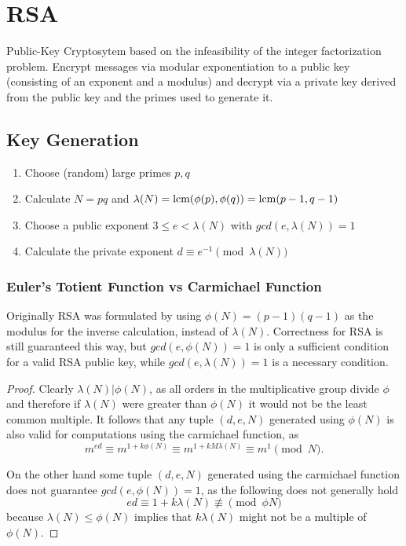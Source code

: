

\chapter{RSA}
\label{chap:rsa}

Public-Key Cryptosytem based on the infeasibility of the integer factorization problem. Encrypt messages via modular exponentiation to a public key (consisting of an exponent and a modulus) and decrypt via a private key derived from the public key and the primes used to generate it.

\section{Key Generation}
\begin{enumerate}
  \item Choose (random) large primes $p, q$
  \item Calculate $N = pq$ and $\lambda(N) = \operatorname{lcm}(\phi(p), \phi(q)) = \operatorname{lcm}(p-1, q-1)$
  \item Choose a public exponent $3 \leq e < \lambda(N)$ with $gcd(e, \lambda(N)) = 1$
  \item Calculate the private exponent $d \equiv e^{-1} \pmod{\lambda(N)}$
\end{enumerate}

\subsection{Euler's Totient Function vs Carmichael Function}

Originally RSA was formulated by using $\phi(N) = (p-1)(q-1)$ as the modulus for the inverse calculation, instead of $\lambda(N)$. Correctness for RSA is still guaranteed this way, but $gcd(e, \phi(N)) = 1$ is only a sufficient condition for a valid RSA public key, while $gcd(e, \lambda(N)) = 1$ is a necessary condition.

\begin{proof}
  Clearly $\lambda(N) | \phi(N)$, as all orders in the multiplicative group divide $\phi$ and therefore if $\lambda(N)$ were greater than $\phi(N)$ it would not be the least common multiple. It follows that any tuple $(d, e, N)$ generated using $\phi(N)$ is also valid for computations using the carmichael function, as
  \[ m^{ed} \equiv m^{1 + k\phi(N)} \equiv m^{1 + kM\lambda(N)} \equiv m^1 \pmod{N}. \]

  On the other hand some tuple $(d, e, N)$ generated using the carmichael function does not guarantee $gcd(e, \phi(N)) = 1$, as the following does not generally hold
  \[ ed \equiv 1 + k\lambda(N) \nequiv \pmod{\phi{N}} \]
  because $\lambda(N) \leq \phi(N)$ implies that $k\lambda(N)$ might not be a multiple of $\phi(N)$.
\end{proof}


